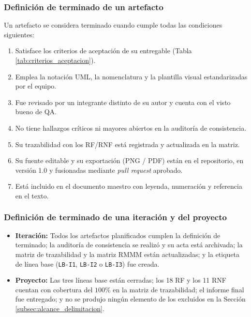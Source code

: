 \subsubsection{Definición de terminado de un artefacto}
Un artefacto se considera terminado cuando cumple todas las condiciones siguientes:
\begin{enumerate}
    \item Satisface los criterios de aceptación de su entregable (Tabla \ref{tab:criterios_aceptacion}).
    \item Emplea la notación UML, la nomenclatura y la plantilla visual estandarizadas por el equipo.
    \item Fue revisado por un integrante distinto de su autor y cuenta con el visto bueno de QA.
    \item No tiene hallazgos críticos ni mayores abiertos en la auditoría de consistencia.
    \item Su trazabilidad con los RF/RNF está registrada y actualizada en la matriz.
    \item Su fuente editable y su exportación (PNG / PDF) están en el repositorio, en versión 1.0 y fusionadas mediante \textit{pull request} aprobado.
    \item Está incluido en el documento maestro con leyenda, numeración y referencia en el texto.
\end{enumerate}

\subsubsection{Definición de terminado de una iteración y del proyecto}
\begin{itemize}
    \item \textbf{Iteración:} Todos los artefactos planificados cumplen la definición de terminado; la auditoría de consistencia se realizó y su acta está archivada; la matriz de trazabilidad y la matriz RMMM están actualizadas; y la etiqueta de línea base (\texttt{LB-I1}, \texttt{LB-I2} o \texttt{LB-I3}) fue creada.
    \item \textbf{Proyecto:} Las tres líneas base están cerradas; los 18 RF y los 11 RNF cuentan con cobertura del $100\%$ en la matriz de trazabilidad; el informe final fue entregado; y no se produjo ningún elemento de los excluidos en la Sección \ref{subsec:alcance_delimitacion}.
\end{itemize}